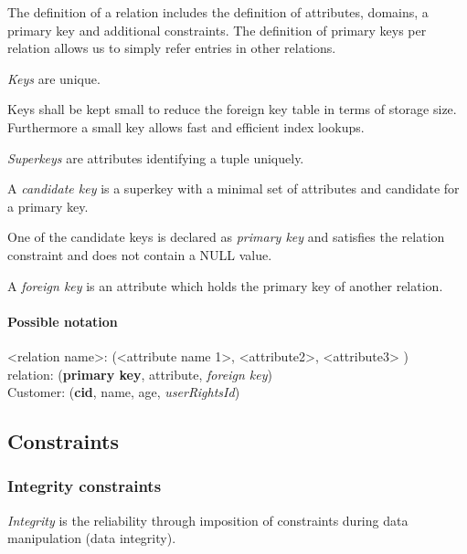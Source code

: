 \documentclass[a4paper,twocolumn]{article}
\begin{document}
The definition of a relation includes the definition of attributes,
domains, a primary key and additional constraints. The definition
of primary keys per relation allows us to simply refer entries in
other relations.

\begin{description}
  \item \emph{Keys} are unique.
  \item Keys shall be kept small to reduce the foreign key table
        in terms of storage size. Furthermore a small key allows
        fast and efficient index lookups.
  \item \emph{Superkeys} are attributes identifying a tuple uniquely.
  \item A \emph{candidate key} is a superkey with a minimal set of
        attributes and candidate for a primary key.
  \item One of the candidate keys is declared as \emph{primary key}
        and satisfies the relation constraint and does not contain a
        NULL value.
  \item A \emph{foreign key} is an attribute which holds the primary key of
        another relation.
\end{description}

\paragraph{Possible notation \\}

\textless relation name\textgreater:
    (\textless attribute name 1\textgreater,
     \textless attribute2\textgreater,
     \textless attribute3\textgreater
    ) \\
relation: (\textbf{primary key}, attribute,
    \textit{foreign key}) \\
Customer: (\textbf{cid}, name, age, \textit{userRightsId})

\subsection{Constraints}

\subsubsection{Integrity constraints}

\emph{Integrity} is the reliability through imposition of constraints
during data manipulation (data integrity).
\end{document}
